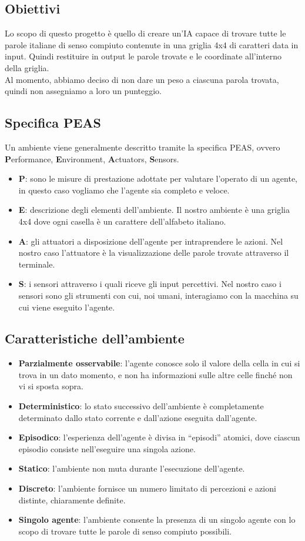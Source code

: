 \documentclass[10pt,a4paper]{article}
\begin{document}
	\subsection{Obiettivi}
	Lo scopo di questo progetto è quello di creare un'IA capace di trovare tutte le parole italiane di senso compiuto contenute in una griglia 4x4 di caratteri data in input.
	Quindi restituire in output le parole trovate e le coordinate all'interno della griglia.\\
	Al momento, abbiamo deciso di non dare un peso a ciascuna parola trovata, quindi non assegniamo a loro un punteggio.
	\subsection{Specifica PEAS}
	Un ambiente viene generalmente descritto tramite la specifica PEAS, ovvero \textbf{P}erformance, \textbf{E}nvironment, \textbf{A}ctuators, \textbf{S}ensors.
	\begin{itemize}
		\item \textbf{P}: sono le misure di prestazione adottate per valutare l’operato di un agente, in questo caso vogliamo che l'agente sia completo e veloce.
		\item \textbf{E}: descrizione degli elementi dell'ambiente. Il nostro ambiente è una griglia 4x4 dove ogni casella è un carattere dell'alfabeto italiano.
		\item \textbf{A}: gli attuatori a disposizione dell'agente per intraprendere le azioni. Nel nostro caso l'attuatore è la visualizzazione delle parole
		trovate attraverso il terminale.
		\item \textbf{S}: i sensori attraverso i quali riceve gli input percettivi. Nel nostro caso i sensori sono gli strumenti con cui, noi umani, interagiamo con la macchina su cui viene eseguito l'agente.
	\end{itemize}
	\subsection{Caratteristiche dell'ambiente}
	\begin{itemize}
		\item \textbf{Parzialmente osservabile}: l'agente conosce solo il valore della cella in cui si trova in un dato momento, e non ha informazioni sulle altre celle finché non vi si sposta sopra.
		\item \textbf{Deterministico}: lo stato successivo dell’ambiente è completamente determinato dallo stato corrente e dall’azione eseguita dall’agente.
		\item \textbf{Episodico}: l’esperienza dell’agente è divisa in “episodi” atomici, dove ciascun episodio consiste nell’eseguire una singola azione.
		\item \textbf{Statico}: l'ambiente non muta durante l'esecuzione dell'agente.
		\item \textbf{Discreto}: l’ambiente fornisce un numero limitato di percezioni e azioni distinte, chiaramente definite.
		\item \textbf{Singolo agente}: l'ambiente consente la presenza di  un singolo agente con lo scopo di trovare tutte le parole di senso compiuto possibili.
	\end{itemize}
\end{document}

